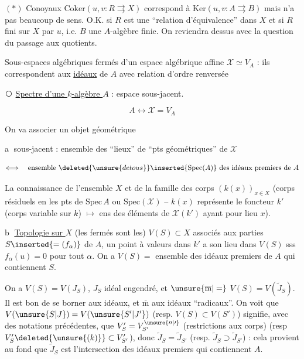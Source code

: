 $(*)$ Conoyaux $\mathrm{Coker}(u,v:R\rightrightarrows X)$ correspond à $\mathrm{Ker}(u,v:A\rightrightarrows B)$ mais n'a pas beaucoup de sens. O.K. si $R$ est une ``relation d'équivalence'' dans $X$ et si $R$ fini sur $X$ par $u$, i.e. $B$ une $A$-algèbre finie. On reviendra dessus avec la question du passage aux quotients.

Sous-espaces algébriques fermés d'un espace algébrique affine $\mathscr X\simeq V_A$ : ils correspondent aux \uline{idéaux} de $A$ avec relation d'ordre renversée

\textcircled{} \uline{Spectre d'une $k$-algèbre $A$} : espace sous-jacent.

\[
A\longleftrightarrow\mathscr X=V_A
\]

On va associer un objet géométrique

\textcircled{a}  sous-jacent : ensemble  des ``lieux''  de ``pts géométriques'' de $\mathscr X$

\[
\Longleftrightarrow\quad\text{ensemble }\deleted{\unsure{de tous}}\inserted{\mathrm{Spec}(A)}\ \text{des idéaux premiers de } A
\]


La connaissance de l'ensemble $X$ et de la famille des corps $(k(x))_{x\in X}$ (corps résiduels  en les pts de $\mathrm{Spec}\,A$ ou $\mathrm{Spec}(\mathscr X)$ -- $k(x)$ représente le foncteur $k'$ (corps variable sur $k$) $\longmapsto$ ens des  éléments de $\mathscr X(k')$ ayant pour lieu $x$).

\textcircled{b} \uline{Topologie sur $X$} (les fermés sont les) $V(S)\subset X$ associés aux parties $S\inserted{=(f_\alpha)}$ de $A$,  un point  à valeurs dans $k'$ a son lieu dans $V(S)$ sss $f_\alpha(u)=0$ pour tout $\alpha$. On a  $V(S)=$ ensemble des idéaux premiers de $A$ qui contiennent $S$.

On a $V(S)=V(J_S)$, $J_S$ idéal engendré, et $\unsure{\overline{\mathrm m}|=}$ $V(S)=V(\widetilde J_S)$. Il  est bon de se borner aux idéaux, et $\overline{\mathrm m}$ aux idéaux ``radicaux''.  On voit que $V(\unsure{S|J})=V(\unsure{S'|J'})$ (resp. $V(S)\subset V(S')$) signifie, avec des notations précédentes, que $V'_S=V^{\unsure{\prime\prime|\prime}}_{S'}$ (restrictions aux corps)  (resp $V'_S\deleted{\unsure{(k)}}\subset V'_{S'}$), donc $\widetilde J_S=\widetilde J_{S'}$ (resp. $\widetilde J_S\supset\widetilde J_{S'}$) : cela provient au fond que $\widetilde J_S$ est l'intersection des idéaux premiers qui contiennent $A$.

